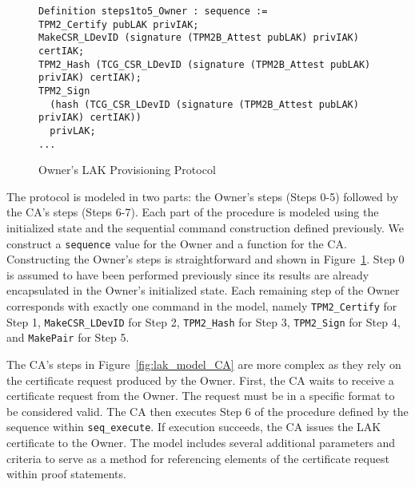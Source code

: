 \documentclass[runningheads]{llncs}
\begin{document}



\begin{figure}[hpbt]
  \vspace{-\medskipamount}
  \vspace{-\medskipamount}
\begin{lstlisting}[language=Coq]
Definition steps1to5_Owner : sequence :=
TPM2_Certify pubLAK privIAK;
MakeCSR_LDevID (signature (TPM2B_Attest pubLAK) privIAK) certIAK;
TPM2_Hash (TCG_CSR_LDevID (signature (TPM2B_Attest pubLAK) privIAK) certIAK);
TPM2_Sign 
  (hash (TCG_CSR_LDevID (signature (TPM2B_Attest pubLAK) privIAK) certIAK))
  privLAK;
...
\end{lstlisting}
\caption{Owner's LAK Provisioning Protocol}
\label{fig:lak_model_Owner}
\end{figure}

The protocol is modeled in two parts: the Owner's steps (Steps 0-5)
followed by the CA's steps (Steps 6-7).  Each part of the procedure is
modeled using the initialized state and the sequential command
construction defined previously.  We construct a \verb|sequence| value
for the Owner and a function for the CA. Constructing the Owner's
steps is straightforward and shown in
Figure~\ref{fig:lak_model_Owner}. Step 0 is assumed to have been
performed previously since its results are already encapsulated in the
Owner's initialized state.  Each remaining step of the Owner
corresponds with exactly one command in the model, namely
\verb|TPM2_Certify| for Step 1, \verb|MakeCSR_LDevID| for Step 2,
\verb|TPM2_Hash| for Step 3, \verb|TPM2_Sign| for Step 4, and
\verb|MakePair| for Step 5.

The CA's steps in Figure~\ref{fig:lak_model_CA} are more complex as
they rely on the certificate request produced by the Owner. 
First, the CA waits to receive a certificate request from the
Owner. The request must be in a specific
format to be considered valid. The CA then executes Step 6 of the
procedure defined by the sequence within \verb|seq_execute|. If
execution succeeds, the CA issues the LAK certificate to the Owner.
The model includes several additional parameters and criteria to serve
as a method for referencing elements of the certificate request
within proof statements.
\end{document}
